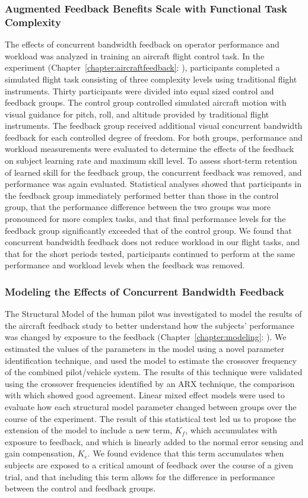\subsubsection{Augmented Feedback Benefits Scale with Functional Task Complexity}
The effects of concurrent bandwidth feedback on operator performance and workload was analyzed in training an aircraft flight control task.
In the experiment (Chapter~\ref{chapter:aircraftfeedback}: ), participants completed a simulated flight task consisting of three complexity levels using traditional flight instruments.
Thirty participants were divided into equal sized control and feedback groups.
The control group controlled simulated aircraft motion with visual guidance for pitch, roll, and altitude provided by traditional flight instruments.
The feedback group received additional visual concurrent bandwidth feedback for each controlled degree of freedom.
For both groups, performance and workload measurements were evaluated to determine the effects of the feedback on subject learning rate and maximum skill level.
To assess short-term retention of learned skill for the feedback group, the concurrent feedback was removed, and performance was again evaluated.
Statistical analyses showed that participants in the feedback group immediately performed better than those in the control group, that the performance difference between the two groups was more pronounced for more complex tasks, and that final performance levels for the feedback group significantly exceeded that of the control group.
We found that concurrent bandwidth feedback does not reduce workload in our flight tasks, and that for the short periods tested, participants continued to perform at the same performance and workload levels when the feedback was removed.

\subsubsection{Modeling the Effects of Concurrent Bandwidth Feedback}
The Structural Model of the human pilot was investigated to model the results of the aircraft feedback study to better understand how the subjects' performance was changed by exposure to the feedback (Chapter~\ref{chapter:modeling}: ).
We estimated the values of the parameters in the model using a novel parameter identification technique, and used the model to estimate the crossover frequency of the combined pilot/vehicle system.
The results of this technique were validated using the crossover frequencies identified by an ARX technique, the comparison with which showed good agreement.
Linear mixed effect models were used to evaluate how each structural model parameter changed between groups over the course of the experiment.
The result of this statistical test led us to propose the extension of the model to include a new term, $K_f$, which accumulates with exposure to feedback, and which is linearly added to the normal error sensing and gain compensation, $K_e$.
We found evidence that this term accumulates when subjects are exposed to a critical amount of feedback over the course of a given trial, and that including this term allows for the difference in performance between the control and feedback groups.

